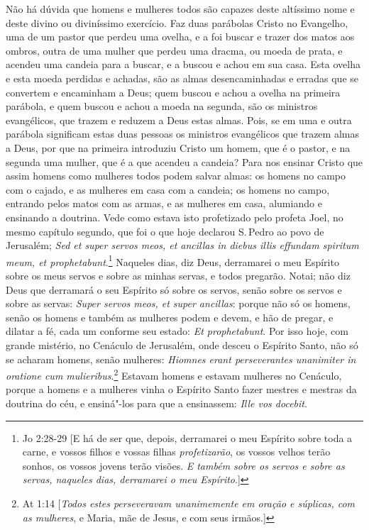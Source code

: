 Não há dúvida que homens e mulheres todos são capazes deste altíssimo
nome e deste divino ou diviníssimo exercício. Faz duas parábolas Cristo
no Evangelho, uma de um pastor que perdeu uma ovelha, e a foi buscar e
trazer dos matos aos ombros, outra de uma mulher que perdeu uma dracma,
ou moeda de prata, e acendeu uma candeia para a buscar, e a buscou e
achou em sua casa. Esta ovelha e esta moeda perdidas e achadas, são as
almas desencaminhadas e erradas que se convertem e encaminham a Deus;
quem buscou e achou a ovelha na primeira parábola, e quem buscou e achou
a moeda na segunda, são os ministros evangélicos, que trazem e reduzem a
Deus estas almas. Pois, se em uma e outra parábola significam estas duas
pessoas os ministros evangélicos que trazem almas a Deus, por que na
primeira introduziu Cristo um homem, que é o pastor, e na segunda uma
mulher, que é a que acendeu a candeia? Para nos ensinar Cristo que assim
homens como mulheres todos podem salvar almas: os homens no campo com o
cajado, e as mulheres em casa com a candeia; os homens no campo,
entrando pelos matos com as armas, e as mulheres em casa, alumiando e
ensinando a doutrina.
Vede como estava isto profetizado pelo profeta Joel, no mesmo capítulo
segundo, que foi o que hoje declarou S.\,Pedro ao povo de Jerusalém;
\emph{Sed et super servos meos, et ancillas in diebus illis effundam
spiritum meum, et prophetabunt}.\footnote{Jo 2:28-29 [E há de ser que, depois, derramarei o meu Espírito sobre toda a carne, e vossos filhos e vossas filhas \emph{profetizarão}, os vossos velhos terão sonhos, os vossos jovens terão visões. \emph{E também
sobre os servos e sobre as servas, naqueles dias, derramarei o meu Espírito}.]} Naqueles dias, diz Deus,
derramarei o meu Espírito sobre os meus servos e sobre as minhas
servas, e todos pregarão. Notai; não diz Deus que derramará o seu
Espírito só sobre os servos, senão sobre os servos e sobre as servas:
\emph{Super servos meos, et super ancillas}: porque não só os homens,
senão os homens e também as mulheres podem e devem, e hão de pregar, e
dilatar a fé, cada um conforme seu estado: \emph{Et prophetabunt}. Por
isso hoje, com grande mistério, no Cenáculo de Jerusalém, onde desceu o
Espírito Santo, não só se acharam homens, senão mulheres: \emph{Hiomnes
erant perseverantes unanimiter in oratione cum mulieribus}.\footnote{At 1:14 [\emph{Todos estes perseveravam unanimemente em oração e súplicas, com as mulheres}, e
Maria, mãe de Jesus, e com seus irmãos.]} Estavam
homens e estavam mulheres no Cenáculo, porque a homens e a mulheres
vinha o Espírito Santo fazer mestres e mestras da doutrina do céu, e
ensiná"-los para que a ensinassem: \emph{Ille vos docebit}.

